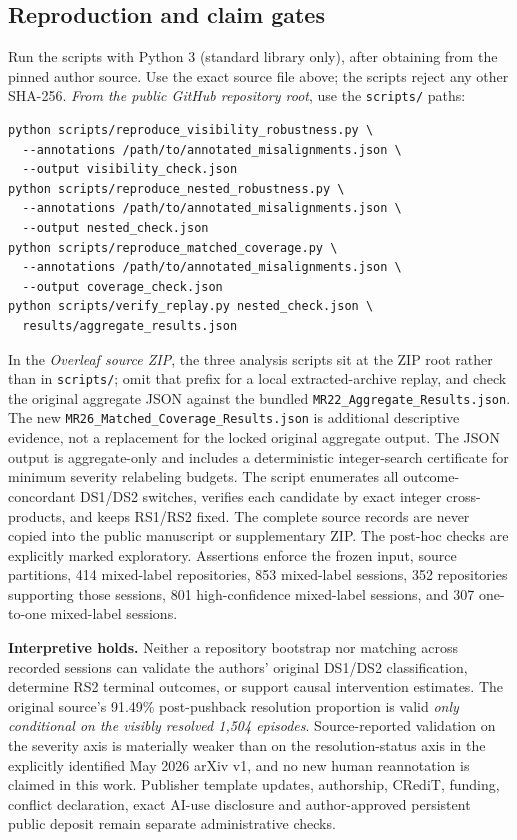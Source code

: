 \subsection{Reproduction and claim gates}\label{app:reproduction}
Run the scripts with Python 3 (standard library only), after obtaining  from the pinned author source. Use the exact source file above; the scripts reject any other SHA-256. \emph{From the public GitHub repository root}, use the \texttt{scripts/} paths:
\begingroup\footnotesize
\begin{verbatim}
python scripts/reproduce_visibility_robustness.py \
  --annotations /path/to/annotated_misalignments.json \
  --output visibility_check.json
python scripts/reproduce_nested_robustness.py \
  --annotations /path/to/annotated_misalignments.json \
  --output nested_check.json
python scripts/reproduce_matched_coverage.py \
  --annotations /path/to/annotated_misalignments.json \
  --output coverage_check.json
python scripts/verify_replay.py nested_check.json \
  results/aggregate_results.json
\end{verbatim}
\endgroup
In the \emph{Overleaf source ZIP}, the three analysis scripts sit at the ZIP root rather than in \texttt{scripts/}; omit that prefix for a local extracted-archive replay, and check the original aggregate JSON against the bundled \texttt{MR22\_Aggregate\_Results.json}. The new \texttt{MR26\_Matched\_Coverage\_Results.json} is additional descriptive evidence, not a replacement for the locked original aggregate output.
The JSON output is aggregate-only and includes a deterministic integer-search certificate for minimum severity relabeling budgets. The script enumerates all outcome-concordant DS1/DS2 switches, verifies each candidate by exact integer cross-products, and keeps RS1/RS2 fixed. The complete source records are never copied into the public manuscript or supplementary ZIP. The post-hoc checks are explicitly marked exploratory. Assertions enforce the frozen input, source partitions, 414 mixed-label repositories, 853 mixed-label sessions, 352 repositories supporting those sessions, 801 high-confidence mixed-label sessions, and 307 one-to-one mixed-label sessions.

\noindent\textbf{Interpretive holds.} Neither a repository bootstrap nor matching across recorded sessions can validate the authors' original DS1/DS2 classification, determine RS2 terminal outcomes, or support causal intervention estimates. The original source's 91.49\% post-pushback resolution proportion is valid \emph{only conditional on the visibly resolved 1,504 episodes}. Source-reported validation on the severity axis is materially weaker than on the resolution-status axis in the explicitly identified May 2026 arXiv v1, and no new human reannotation is claimed in this work. Publisher template updates, authorship, CRediT, funding, conflict declaration, exact AI-use disclosure and author-approved persistent public deposit remain separate administrative checks.
